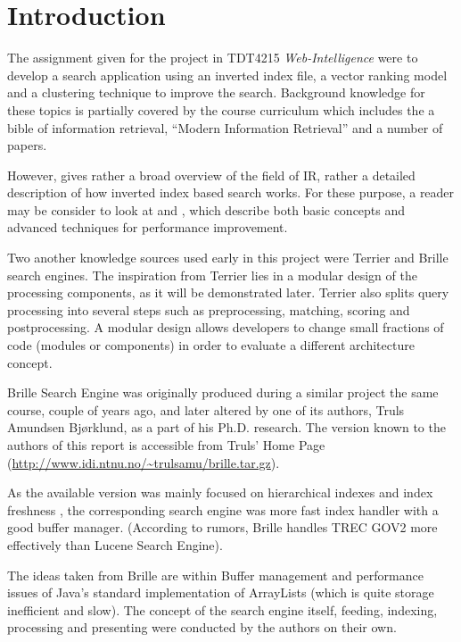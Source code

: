 \chapter{Introduction}
\thispagestyle{fancy}
\label{sec:introduction}

The assignment given for the project in TDT4215 {\it Web-Intelligence} were to develop a search application using an inverted index file, a vector ranking model and a clustering technique to improve the search. Background knowledge for these topics is partially covered by the course curriculum which includes the a bible of information retrieval, ``Modern Information Retrieval'' \cite{553876} and a number of papers.

However, \cite{553876} gives rather a broad overview of the field of IR, rather a detailed description of how inverted index based search works. For these purpose, a reader may be consider to look at \cite{1132959} and \cite{323905}, which describe both basic concepts and advanced techniques for performance improvement.

Two another knowledge sources used early in this project were Terrier \cite{ounis06terrier-osir} and Brille \cite{truls} search engines. The inspiration from Terrier lies in a modular design of the processing components, as it will be demonstrated later. Terrier also splits query processing into several steps such as preprocessing, matching, scoring and postprocessing. A modular design allows developers to change small fractions of code (modules or components) in order to evaluate a different architecture concept.

Brille Search Engine was originally produced during a similar project the same course, couple of years ago, and later altered by one of its authors, Truls Amundsen Bjørklund, as a part of his Ph.D. research. The version known to the authors of this report is accessible from Truls' Home Page (\url{http://www.idi.ntnu.no/~trulsamu/brille.tar.gz}).

As the available version was mainly focused on hierarchical indexes and index freshness \cite{truls}, the corresponding search engine was more fast index handler with a good buffer manager. (According to rumors, Brille handles TREC GOV2 more effectively than Lucene Search Engine).

The ideas taken from Brille are within Buffer management and performance issues of Java's standard implementation of ArrayLists (which is quite storage inefficient and slow). The concept of the search engine itself, feeding, indexing, processing and presenting were conducted by the authors on their own.

